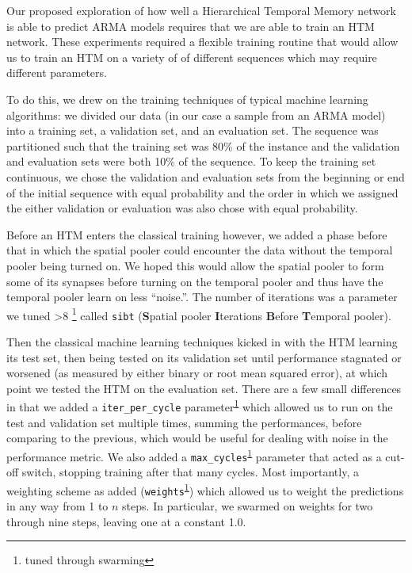 \documentclass[oneside,12pt,openany]{book}
\newcounter{savefootnote}
\newcounter{symfootnote}
\newcommand{\astfootnote}[1]{%
    \setcounter{savefootnote}{\value{footnote}}%
    \setcounter{footnote}{\value{symfootnote}}%
    \ifnum\value{footnote}>8\setcounter{footnote}{0}\fi%
    \let\oldthefootnote=\thefootnote%
    \renewcommand{\thefootnote}{\fnsymbol{footnote}}%
    \footnote{#1}%
    \let\thefootnote=\oldthefootnote%
    \setcounter{symfootnote}{\value{footnote}}%
    \setcounter{footnote}{\value{savefootnote}}%
}
\begin{document}
	Our proposed exploration of how well a Hierarchical Temporal Memory network is able to predict ARMA models requires that we are able to train an HTM network. These experiments required a flexible training routine that would allow us to train an HTM on a variety of of different sequences which may require different parameters. 
	
	To do this, we drew on the training techniques of typical machine learning algorithms: we divided our data (in our case a sample from an ARMA model) into a training set, a validation set, and an evaluation set. The sequence was partitioned such that the training set was 80\% of the instance and the validation and evaluation sets were both 10\% of the sequence. To keep the training set continuous, we chose the validation and evaluation sets from the beginning or end of the initial sequence with equal probability and the order in which we assigned the either validation or evaluation was also chose with equal probability.
    
    Before an HTM enters the classical training however, we added a phase before that in which the spatial pooler could encounter the data without the temporal pooler being turned on. We hoped this would allow the spatial pooler to form some of its synapses before turning on the temporal pooler and thus have the temporal pooler learn on less ``noise.''. The number of iterations was a parameter we tuned\astfootnote{tuned through swarming\label{footnote:swarm}} called \texttt{sibt} (\textbf{S}patial pooler \textbf{I}terations \textbf{B}efore \textbf{T}emporal pooler).
	
	Then the classical machine learning techniques kicked in with the HTM learning its test set, then being tested on its validation set until performance stagnated or worsened (as measured by either binary or root mean squared error), at which point we tested the HTM on the evaluation set. There are a few small differences in that we added a \texttt{iter\_per\_cycle} parameter\textsuperscript{\ref{footnote:swarm}} which allowed us to run on the test and validation set multiple times, summing the performances, before comparing to the previous, which would be useful for dealing with noise in the performance metric. We also added a \texttt{max\_cycles}\textsuperscript{\ref{footnote:swarm}} parameter that acted as a cut-off switch, stopping training after that many cycles. Most importantly, a weighting scheme as added (\texttt{weights}\textsuperscript{\ref{footnote:swarm}}) which allowed us to weight the predictions in any way from 1 to $n$ steps. In particular, we swarmed on weights for two through nine steps, leaving one at a constant 1.0.
	
\end{document}
